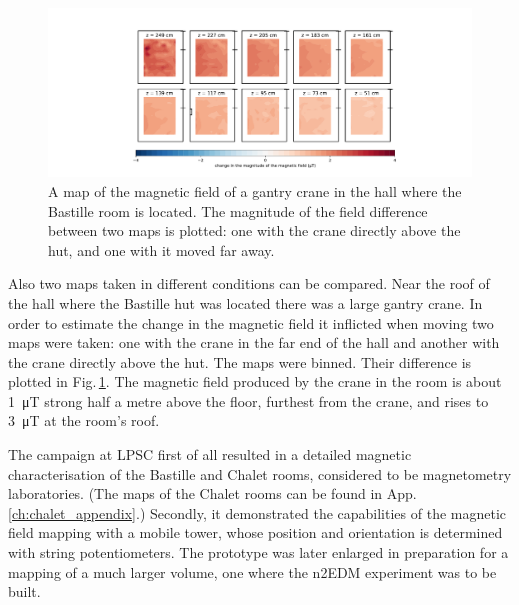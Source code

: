 \begin{figure}
  \centering
  \includegraphics[width=\linewidth]{gfx/mapping/lpsc/bastille_crane_change_magnitude_crop.pdf}
  \caption{A map of the magnetic field of a gantry crane in the hall where the Bastille room is located. The magnitude of the field difference between two maps is plotted: one with the crane directly above the hut, and one with it moved far away.}\label{fig:mapping_bastille_crane_change}
\end{figure}

Also two maps taken in different conditions can be compared. Near the roof of the hall where the Bastille hut was located there was a large gantry crane. In order to estimate the change in the magnetic field it inflicted when moving two maps were taken: one with the crane in the far end of the hall and another with the crane directly above the hut. The maps were binned. Their difference is plotted in Fig.\,\ref{fig:mapping_bastille_crane_change}. The magnetic field produced by the crane in the room is about \SI{1}{\micro\tesla} strong half a metre above the floor, furthest from the crane, and rises to \SI{3}{\micro\tesla} at the room's roof.



The campaign at LPSC first of all resulted in a detailed magnetic characterisation of the Bastille and Chalet rooms, considered to be magnetometry laboratories. (The maps of the Chalet rooms can be found in App.\,\ref{ch:chalet_appendix}.) Secondly, it demonstrated the capabilities of the magnetic field mapping with a mobile tower, whose position and orientation is determined with string potentiometers. The prototype was later enlarged in preparation for a mapping of a much larger volume, one where the n2EDM experiment was to be built.




